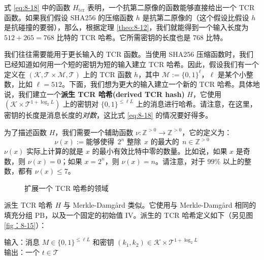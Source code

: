 \begin{snote}[用于长输入的目标抗碰撞性。]
式 \ref{eq:8-18} 中的函数 $H_\mathrm{tcr}$ 表明，一个抗第二原像的函数能够直接给出一个 TCR 函数。如果我们假设 SHA256 的压缩函数 $h$ 是抗第二原像的（这个假设比假设 $h$ 是抗碰撞的要弱），那么，根据定理 \ref{theo:8-12}，我们就能得到一个输入长度为 $512+265=768$ 比特的 TCR 哈希。它所需密钥的长度也是 $768$ 比特。

我们往往需要能用于更长输入的 TCR 函数。当使用 SHA256 压缩函数时，我们已经知道如何用一个短的密钥为短的输入建立 TCR 哈希。因此，假设我们有一个定义在 $(\mathcal{K},\mathcal{T}\times\mathcal{M},\mathcal{T})$ 上的 TCR 函数 $h$，其中 $\mathcal{M}:=\{0,1\}^\ell$，$\ell$ 是某个小整数，比如 $\ell=512$。下面，我们想为更大的输入建立一个新的 TCR 哈希。具体地说，我们建立一个\textbf{派生 TCR 哈希(derived TCR hash)} $H$，它使用 $(\mathcal{K}\times\mathcal{T}^{1+\log_2L})$ 上的密钥对 $\{0,1\}^{\leq\ell L}$ 上的消息进行哈希。请注意，在这里，密钥的长度是消息长度的\emph{对数}，这比式 \ref{eq:8-18} 的情况要好得多。

为了描述函数 $H$，我们需要一个辅助函数 $\nu:\mathbb{Z}^{>0}\to\mathbb{Z}^{>0}$，它的定义为：
\[
\nu(x):=\text{能够使得}\;\, 2^n \text{ 整除}\;\, x \text{ 的最大的}\;\, n\in\mathbb{Z}^{>0}
\]
$\nu(x)$ 实际上计算的就是 $x$ 的最小有效比特中零的数量。比如说，如果 $x$ 是奇数，则 $\nu(x)=0$；如果 $x=2^n$，则 $\nu(x)=n$。请注意，对于 $99$\% 以上的整数，都有 $\nu(x)\leq 7$。

\begin{figure}
	\centering
	
	\caption{扩展一个 TCR 哈希的领域}
	\label{fig:8-15}
\end{figure}

派生 TCR 哈希 $H$ 与 Merkle-Damg{\aa}rd 类似。它使用与 Merkle-Damg{\aa}rd 相同的填充分组 $\mathrm{PB}$，以及一个固定的初始值 $\mathrm{IV}$。派生的 TCR 哈希定义如下（另见图 \ref{fig：8-15}）：

\vspace{5pt}

\hspace*{5pt} 输入：消息 $M\in\{0,1\}^{\leq\ell L}$ 和密钥 $(k_1,k_2)\in\mathcal{K}\times\mathcal{T}^{1+\log_2L}$\\
\hspace*{26pt} 输出：一个 $t\in\mathcal{T}$

\vspace{5pt}


\end{snote}
